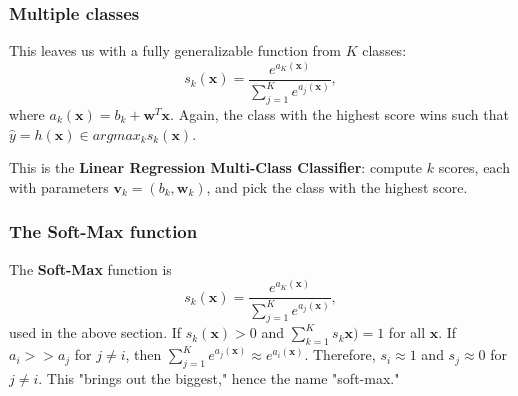\documentclass[titlepage, 12pt, leqno]{article}
\begin{document}
\subsubsection{Multiple classes}
This leaves us with a fully generalizable function from $K$ classes:
\[
s_{k}(\textbf{x}) = \frac{e^{a_{K}(\textbf{x})}}{\sum_{j=1}^{K}e^{a_{j}
(\textbf{x})}},
\]
where $a_{k}(\textbf{x}) = b_{k} + \textbf{w}^{T}\textbf{x}$. Again, the class
with the highest score wins such that $\hat y = h(\textbf{x}) \in argmax_{k}
s_{k}(\textbf{x})$. 

\begin{definition}
    This is the \textbf{Linear Regression Multi-Class Classifier}: compute $k$
    scores, each with parameters $\textbf{v}_{k}=(b_{k},\textbf{w}_{k})$, and
    pick the class with the highest score.
\end{definition}

\subsubsection{The Soft-Max function}
The \textbf{Soft-Max} function is
\[
s_{k}(\textbf{x}) = \frac{e^{a_{K}(\textbf{x})}}{\sum_{j=1}^{K}e^{a_{j}
(\textbf{x})}},
\]
used in the above section. If $s_{k}(\textbf{x}) >0$ and $\sum_{k=1}^{K}
s_{k}\textbf{x}) = 1$ for all $\textbf{x}$. If $a_{i} >> a_{j}$ for $j\ne i$,
then $\sum_{j=1}^{K} e^{a_{j}(\textbf{x})} \approx e^{a_{i}(\textbf{x})}$.
Therefore, $s_{i} \approx 1$ and $s_{j} \approx 0$ for $j \ne i$. This "brings
out the biggest," hence the name "soft-max."
\end{document}
